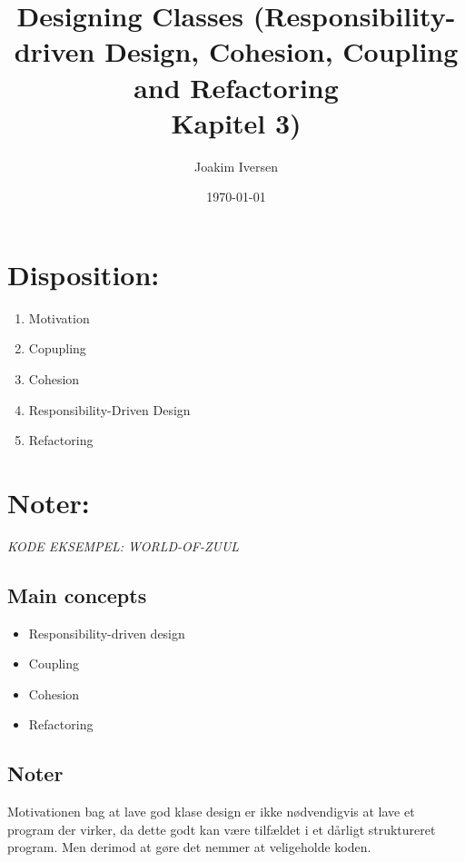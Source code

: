 \documentclass{article}
\title{Designing Classes (Responsibility-driven Design, Cohesion, Coupling and Refactoring \\
			Kapitel 3)}
\author{Joakim Iversen}
\date{\today}
\begin{document}
\maketitle
\newpage

\section*{Disposition:}
\begin{enumerate}
    \item Motivation
    \item Copupling
    \item Cohesion
    \item Responsibility-Driven Design
    \item Refactoring
\end{enumerate}
\newpage

\section*{Noter:}
\begin{center}
	\textit{KODE EKSEMPEL: WORLD-OF-ZUUL}
\end{center}
\subsection*{Main concepts}
\begin{itemize}
	\item Responsibility-driven design
	\item Coupling
	\item Cohesion
	\item Refactoring
\end{itemize}
\subsection*{Noter}
Motivationen bag at lave god klase design er ikke nødvendigvis at lave et program der virker, da dette godt kan være tilfældet i et dårligt struktureret program. Men derimod at gøre det nemmer at veligeholde koden.
\end{document}
